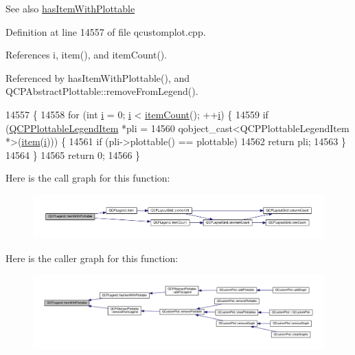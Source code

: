 \begin{DoxySeeAlso}{See also}
\hyperlink{class_q_c_p_legend_a2eb1d24bdf5658e64962a656303fd61a}{has\+Item\+With\+Plottable} 
\end{DoxySeeAlso}


Definition at line 14557 of file qcustomplot.\+cpp.



References i, item(), and item\+Count().



Referenced by has\+Item\+With\+Plottable(), and Q\+C\+P\+Abstract\+Plottable\+::remove\+From\+Legend().


\begin{DoxyCode}
14557                                                                         \{
14558   \textcolor{keywordflow}{for} (\textcolor{keywordtype}{int} \hyperlink{_comparision_pictures_2_createtest_image_8m_a6f6ccfcf58b31cb6412107d9d5281426}{i} = 0; \hyperlink{_comparision_pictures_2_createtest_image_8m_a6f6ccfcf58b31cb6412107d9d5281426}{i} < \hyperlink{class_q_c_p_legend_a198228e9cdc78d3a3c306fa6763d0404}{itemCount}(); ++\hyperlink{_comparision_pictures_2_createtest_image_8m_a6f6ccfcf58b31cb6412107d9d5281426}{i}) \{
14559     \textcolor{keywordflow}{if} (\hyperlink{class_q_c_p_plottable_legend_item}{QCPPlottableLegendItem} *pli =
14560             qobject\_cast<QCPPlottableLegendItem *>(\hyperlink{class_q_c_p_legend_a454272d7094437beb3278a2294006da5}{item}(\hyperlink{_comparision_pictures_2_createtest_image_8m_a6f6ccfcf58b31cb6412107d9d5281426}{i}))) \{
14561       \textcolor{keywordflow}{if} (pli->plottable() == plottable)
14562         \textcolor{keywordflow}{return} pli;
14563     \}
14564   \}
14565   \textcolor{keywordflow}{return} 0;
14566 \}
\end{DoxyCode}


Here is the call graph for this function\+:\nopagebreak
\begin{figure}[H]
\begin{center}
\leavevmode
\includegraphics[width=350pt]{class_q_c_p_legend_a5ee80cf83f65e3b6dd386942ee3cc1ee_cgraph}
\end{center}
\end{figure}




Here is the caller graph for this function\+:\nopagebreak
\begin{figure}[H]
\begin{center}
\leavevmode
\includegraphics[width=350pt]{class_q_c_p_legend_a5ee80cf83f65e3b6dd386942ee3cc1ee_icgraph}
\end{center}
\end{figure}


